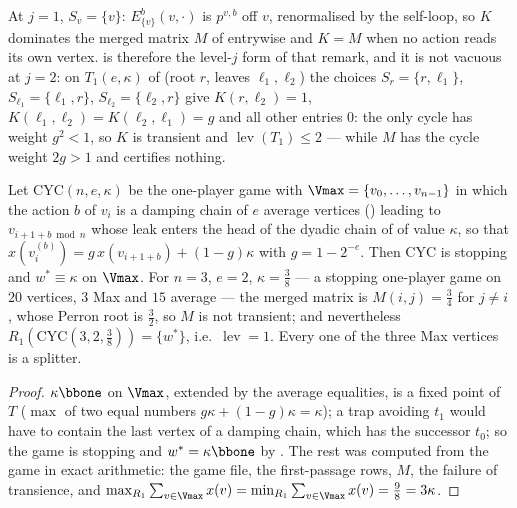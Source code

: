 \begin{remark}\label{xc:exit-generalises}
At $j=1$, $S_v=\{v\}$: $E^{b}_{\{v\}}(v,\cdot)$ is $p^{v,b}$ off $v$, renormalised by the
self-loop, so $K$ dominates the merged matrix $M$ of  entrywise and
$K=M$ when no action reads its own vertex.   is therefore the level-$j$ form of
that remark, and it is not vacuous at $j=2$: on $T_1(e,\kappa)$ of 
(root $r$, leaves $\ell_1,\ell_2$) the choices $S_r=\{r,\ell_1\}$,
$S_{\ell_1}=\{\ell_1,r\}$, $S_{\ell_2}=\{\ell_2,r\}$ give
$K(r,\ell_2)=1$, $K(\ell_1,\ell_2)=K(\ell_2,\ell_1)=g$ and all other entries $0$: the only cycle
has weight $g^{2}<1$, so $K$ is transient and $\operatorname{lev}(T_1)\le2$ --- while $M$ has the
cycle weight $2g>1$ and  certifies nothing.
\end{remark}

\begin{proposition}\label{xc:cyc}
Let $\mathrm{CYC}(n,e,\kappa)$ be the one-player game with $\Vmax=\{v_0,\dots,v_{n-1}\}$ in
which the action $b$ of $v_i$ is a damping chain of $e$ average vertices
() leading to $v_{i+1+b\bmod n}$ whose leak enters the head of the dyadic
chain of  of value $\kappa$, so that
$x(v_i^{(b)})=g\,x(v_{i+1+b})+(1-g)\kappa$ with $g=1-2^{-e}$.  Then $\mathrm{CYC}$ is stopping
and $w^{\ast}\equiv\kappa$ on $\Vmax$.  For $n=3$, $e=2$, $\kappa=\tfrac38$ --- a stopping
one-player game on $20$ vertices, $3$ Max and $15$ average --- the merged matrix is
$M(i,j)=\tfrac34$ for $j\ne i$, whose Perron root is $\tfrac32$, so $M$ is not transient; and
nevertheless $R_1(\mathrm{CYC}(3,2,\tfrac38))=\{w^{\ast}\}$, i.e.\ $\operatorname{lev}=1$.
Every one of the three Max vertices is a splitter.
\end{proposition}

\begin{proof}
$\kappa\bbone$ on $\Vmax$, extended by the average equalities, is a fixed point of $T$
($\max$ of two equal numbers $g\kappa+(1-g)\kappa=\kappa$); a trap avoiding $t_1$ would have to
contain the last vertex of a damping chain, which has the successor $t_0$; so the game is
stopping and $w^{\ast}=\kappa\bbone$ by .  The rest was computed from the
game in exact arithmetic: the game file, the first-passage rows, $M$, the failure of
transience, and $\max_{R_1}\sum_{v\in\Vmax}x(v)=\min_{R_1}\sum_{v\in\Vmax}x(v)=\tfrac98
=3\kappa$.
\end{proof}

